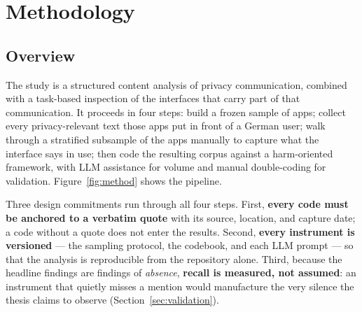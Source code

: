\section{Methodology}
\label{sec:method}

\subsection{Overview}

The study is a structured content analysis of privacy communication, combined
with a task-based inspection of the interfaces that carry part of that
communication. It proceeds in four steps: build a frozen sample of apps; collect
every privacy-relevant text those apps put in front of a German user; walk
through a stratified subsample of the apps manually to capture what the
interface says in use; then code the resulting corpus against a harm-oriented
framework, with LLM assistance for volume and manual double-coding for
validation. Figure~\ref{fig:method} shows the pipeline.

Three design commitments run through all four steps. First, \textbf{every code
must be anchored to a verbatim quote} with its source, location, and capture
date; a code without a quote does not enter the results. Second, \textbf{every
instrument is versioned} --- the sampling protocol, the codebook, and each LLM
prompt --- so that the analysis is reproducible from the repository alone.
Third, because the headline findings are findings of \emph{absence},
\textbf{recall is measured, not assumed}: an instrument that quietly misses a
mention would manufacture the very silence the thesis claims to observe
(Section~\ref{sec:validation}).

